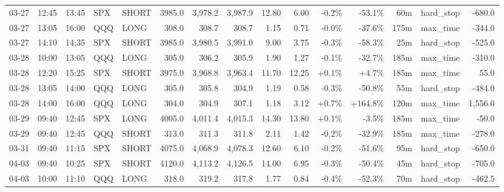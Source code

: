 \documentclass[11pt,a4paper,twoside]{article}
\begin{document}
\begin{landscape}
\begin{center}
\begin{longtable}{>{\color{txtmain}}l l l l l r r r r r r r r >{\color{txtmain}}l r}
03-27 & 12:45 & 13:45 & SPX & SHORT & 3985.0 & 3,978.2 & 3,987.9 & 12.80 & 6.00 & \textcolor{lossred}{-0.2\%} & \textcolor{lossred}{-53.1\%} & 60m & hard\_stop & \textcolor{lossred}{-680.0} \\
03-27 & 13:05 & 16:00 & QQQ & LONG & 308.0 & 308.7 & 308.7 & 1.15 & 0.71 & \textcolor{lossred}{-0.0\%} & \textcolor{lossred}{-37.6\%} & 175m & max\_time & \textcolor{lossred}{-344.0} \\
03-27 & 14:10 & 14:35 & SPX & SHORT & 3985.0 & 3,980.5 & 3,991.0 & 9.00 & 3.75 & \textcolor{lossred}{-0.3\%} & \textcolor{lossred}{-58.3\%} & 25m & hard\_stop & \textcolor{lossred}{-525.0} \\
03-28 & 10:00 & 13:05 & QQQ & LONG & 305.0 & 306.2 & 305.9 & 1.90 & 1.27 & \textcolor{lossred}{-0.1\%} & \textcolor{lossred}{-32.7\%} & 185m & max\_time & \textcolor{lossred}{-310.0} \\
03-28 & 12:20 & 15:25 & SPX & SHORT & 3975.0 & 3,968.8 & 3,963.4 & 11.70 & 12.25 & \textcolor{wingreen}{+0.1\%} & \textcolor{wingreen}{+4.7\%} & 185m & max\_time & \textcolor{wingreen}{55.0} \\
03-28 & 13:05 & 14:00 & QQQ & LONG & 305.0 & 305.8 & 304.9 & 1.19 & 0.58 & \textcolor{lossred}{-0.3\%} & \textcolor{lossred}{-50.8\%} & 55m & hard\_stop & \textcolor{lossred}{-484.0} \\
03-28 & 14:00 & 16:00 & QQQ & LONG & 304.0 & 304.9 & 307.1 & 1.18 & 3.12 & \textcolor{wingreen}{+0.7\%} & \textcolor{wingreen}{+164.8\%} & 120m & max\_time & \textcolor{wingreen}{1,556.0} \\
03-29 & 09:40 & 12:45 & SPX & LONG & 4005.0 & 4,011.4 & 4,015.3 & 14.30 & 13.80 & \textcolor{wingreen}{+0.1\%} & \textcolor{lossred}{-3.5\%} & 185m & max\_time & \textcolor{lossred}{-50.0} \\
03-29 & 09:40 & 12:45 & QQQ & SHORT & 313.0 & 311.3 & 311.8 & 2.11 & 1.42 & \textcolor{lossred}{-0.2\%} & \textcolor{lossred}{-32.9\%} & 185m & max\_time & \textcolor{lossred}{-278.0} \\
03-31 & 09:40 & 11:15 & SPX & SHORT & 4075.0 & 4,068.9 & 4,078.3 & 12.60 & 6.10 & \textcolor{lossred}{-0.2\%} & \textcolor{lossred}{-51.6\%} & 95m & hard\_stop & \textcolor{lossred}{-650.0} \\
04-03 & 09:40 & 10:25 & SPX & SHORT & 4120.0 & 4,113.2 & 4,126.5 & 14.00 & 6.95 & \textcolor{lossred}{-0.3\%} & \textcolor{lossred}{-50.4\%} & 45m & hard\_stop & \textcolor{lossred}{-705.0} \\
04-03 & 10:00 & 11:10 & QQQ & LONG & 318.0 & 319.2 & 317.8 & 1.77 & 0.84 & \textcolor{lossred}{-0.4\%} & \textcolor{lossred}{-52.3\%} & 70m & hard\_stop & \textcolor{lossred}{-462.5} \\

\end{longtable}
\end{center}
\end{landscape}
\end{document}
